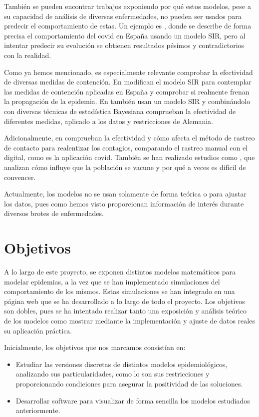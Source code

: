 También se pueden encontrar trabajos exponiendo por qué estos modelos, pese a su capacidad de análisis de diversas enfermedades, no pueden ser usados para predecir el comportamiento de estas. Un ejemplo es \cite{turningpoint}, donde se describe de forma precisa el comportamiento del covid en España usando un modelo SIR, pero al intentar predecir su evolución se obtienen resultados pésimos y contradictorios con la realidad.

Como ya hemos mencionado, es especialmente relevante comprobar la efectividad de diversas medidas de contención. En \cite{gutierrez2020analisis} modifican el modelo SIR para contemplar las medidas de contención aplicadas en España y comprobar si realmente frenan la propagación de la epidemia. En \cite{inferringinterventions} también usan un modelo SIR y combinándolo con diversas técnicas de estadística Bayesiana comprueban la efectividad de diferentes medidas, aplicado a los datos y restricciones de Alemania.

Adicionalmente, en \cite{Mancastroppa2021} comprueban la efectividad y cómo afecta el método de rastreo de contacto para realentizar los contagios, comparando el rastreo manual con el digital, como es la aplicación covid. También se han realizado estudios como \cite{vaccinationproblem}, que analizan cómo influye que la población se vacune y por qué a veces es difícil de convencer.

Actualmente, los modelos no se usan solamente de forma teórica o para ajustar los datos, pues como hemos visto proporcionan información de interés durante diversos brotes de enfermedades.


\section{Objetivos}

A lo largo de este proyecto, se exponen distintos modelos matemáticos para modelar epidemias, a la vez que se han implementado simulaciones del comportamiento de los mismos. Estas simulaciones se han integrado en una página web que se ha desarrollado a lo largo de todo el proyecto. Los objetivos son dobles, pues se ha intentado realizar tanto una exposición y análisis teórico de los modelos como mostrar mediante la implementación y ajuste de datos reales su aplicación práctica.

Inicialmente, los objetivos que nos marcamos consistían en:

\begin{itemize}
\item Estudiar las versiones discretas de distintos modelos epidemiológicos, analizando sus particularidades, como lo son sus restricciones y proporcionando condiciones para asegurar la positividad de las soluciones.
\item Desarrollar software para visualizar de forma sencilla los modelos estudiados anteriormente.
\end{itemize}

